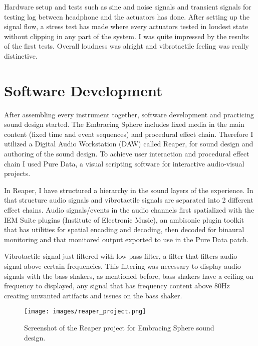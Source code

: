         Hardware setup and tests such as sine and noise signals and transient signals for testing lag between headphone and the actuators has done. After setting up the signal flow, a stress test has made where every actuators tested in loudest state without clipping in any part of the system. I was quite impressed by the results of the first tests. Overall loudness was alright and vibrotactile feeling was really distinctive.\par

    \section{Software Development}
        After assembling every instrument together, software development and practicing sound design started. The Embracing Sphere includes fixed media in the main content (fixed time and event sequences) and procedural effect chain. Therefore I utilized a Digital Audio Workstation (DAW) called Reaper, for sound design and authoring of the sound design. To achieve user interaction and procedural effect chain I used Pure Data, a visual scripting software for interactive audio-visual projects.\par

        In Reaper, I have structured a hierarchy in the sound layers of the experience. In that structure audio signals and vibrotactile signals are separated into 2 different effect chains. Audio signals/events in the audio channels first spatialized with the IEM Suite plugins (Institute of Electronic Music), an ambisonic plugin toolkit that has utilities for spatial encoding and decoding, then decoded for binaural monitoring and that monitored output exported to use in the Pure Data patch.\par

        Vibrotactile signal just filtered with low pass filter, a filter that filters audio signal above certain frequencies. This filtering was necessary to display audio signals with the bass shakers, as mentioned before, bass shakers have a ceiling on frequency to displayed, any signal that has frequency content above 80Hz creating unwanted artifacts and issues on the bass shaker.\par

        \begin{figure}[H]
            \centering
            \texttt{[image: images/reaper\_project.png]}
            \caption{Screenshot of the Reaper project for Embracing Sphere sound design.}
            \label{fig:REAPER}
        \end{figure} 

